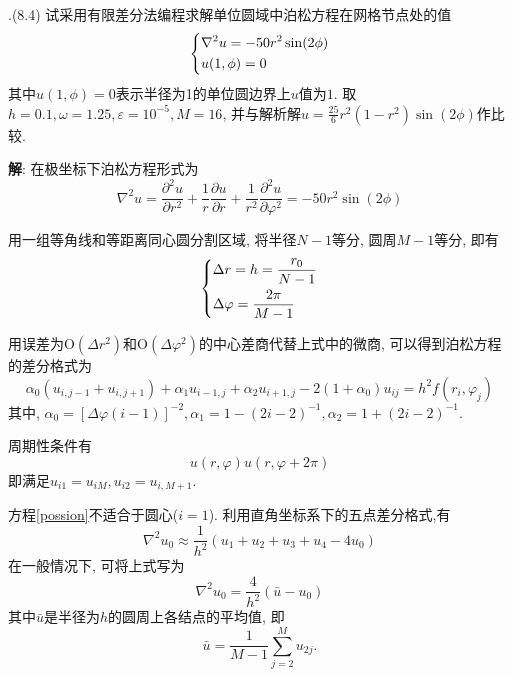 \documentclass{ctexart}
\newcounter{mycnt}
\newenvironment{problem}[1][1.1]{\noindent \stepcounter{mycnt}\themycnt.(#1)}{

}
\newenvironment{answer}{\textbf{解}:}{
\vspace{0.5cm}
}
\begin{document}
\begin{problem}[8.4]
  试采用有限差分法编程求解单位圆域中泊松方程在网格节点处的值
  \begin{equation}
    \left\{
      \begin{lgathered}
        \nabla^2u = -50r^2 \sin (2\phi) \\
        u(1, \phi) = 0
      \end{lgathered}
    \right.
  \end{equation}
  其中$u(1,\phi)=0$表示半径为1的单位圆边界上$u$值为$1$. 取$h = 0.1, \omega = 1.25, \varepsilon = 10^{-5}, M = 16$, 并与解析解$u = \frac{25}{6}r^2(1-r^2) \sin(2\phi)$作比较.
\end{problem}

\begin{answer}
在极坐标下泊松方程形式为
\begin{equation}
  \nabla^2u = \frac{\partial^2u}{\partial r^2} + \frac{1}{r}\frac{\partial u}{\partial r} + \frac{1}{r^2}\frac{\partial^2u}{\partial \varphi^2} = -50r^2 \sin (2\phi)
\end{equation}

用一组等角线和等距离同心圆分割区域, 将半径$N-1$等分, 圆周$M-1$等分, 即有
\begin{equation}
  \left\{
    \begin{lgathered}
      \Delta r = h = \frac{r_0}{N-1} \\
      \Delta \varphi = \frac{2\pi}{M-1}
    \end{lgathered}
  \right.
\end{equation}

用误差为$\mathrm{O}(\Delta r^2)$和$\mathrm{O}(\Delta \varphi^2)$的中心差商代替上式中的微商, 可以得到泊松方程的差分格式为
\begin{equation}\label{possion}
  \alpha_0(u_{i,j-1} + u_{i,j+1}) + \alpha_1u_{i-1,j} + \alpha_2u_{i+1,j} - 2(1+\alpha_0)u_{ij} = h^2 f(r_i,\varphi_j)
\end{equation}
其中, $\alpha_0 = [\Delta\varphi(i-1)]^{-2}, \alpha_1 = 1 - (2i-2)^{-1}, \alpha_2 = 1 + (2i-2)^{-1}$.
\end{answer}

周期性条件有
\begin{equation}
  u(r,\varphi)  u(r, \varphi + 2\pi)
\end{equation}
即满足$u_{i1} = u_{iM}, u_{i2} = u_{i,M+1}$.

方程\eqref{possion}不适合于圆心($i=1$). 利用直角坐标系下的五点差分格式,有
\begin{equation}
  \nabla^2u_0 \approx \frac{1}{h^2}(u_1 + u_2 + u_3 + u_4 - 4u_0)
\end{equation}
在一般情况下, 可将上式写为
\begin{equation}
  \nabla^2 u_0 = \frac{4}{h^2} (\bar{u} - u_0)
\end{equation}
其中$\bar{u}$是半径为$h$的圆周上各结点的平均值, 即
\begin{equation}
  \bar{u} = \frac{1}{M-1} \sum_{j = 2}^{M} u_{2j}.
\end{equation}
\end{document}
